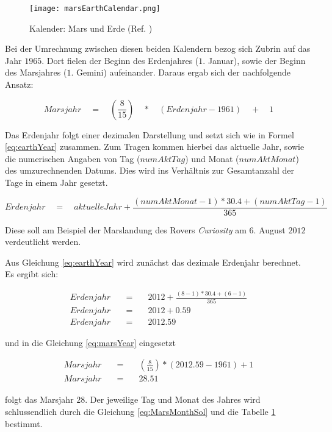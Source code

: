 \begin{figure}[H]
	\centering
	\texttt{[image: marsEarthCalendar.png]}
	\label{fig:marsEarthCalendar}
	\caption{Kalender: Mars und Erde (Ref. \cite{img2})}
\end{figure}

Bei der Umrechnung zwischen diesen beiden Kalendern bezog sich Zubrin auf das
Jahr $1965$. Dort fielen der Beginn des Erdenjahres ($1.$ Januar), sowie der
Beginn des Marsjahres ($1.$ Gemini) aufeinander. Daraus ergab sich der
nachfolgende Ansatz:

\begin{equation}
	Marsjahr \quad = \quad (\frac{8}{15}) \quad * \quad (Erdenjahr - 1961) \quad +
	\quad 1
	\label{eq:marsYear}
\end{equation}

Das Erdenjahr folgt einer dezimalen Darstellung und setzt sich wie in Formel
\ref{eq:earthYear} zusammen. Zum Tragen kommen hierbei das aktuelle Jahr, sowie
die numerischen Angaben von Tag ($numAktTag$) und Monat ($numAktMonat$) des
umzurechnenden Datums. Dies wird ins Verh{\"a}ltnis zur Gesamtanzahl der Tage in
einem Jahr gesetzt.

\begin{equation}
	Erdenjahr \quad = \quad aktuelleJahr + \frac{ (numAktMonat - 1) * 30.4 +
	(numAktTag - 1) }{365}
	\label{eq:earthYear}
\end{equation}

Diese soll am Beispiel der Marslandung des Rovers \textit{Curiosity} am
$6.$ August $2012$ verdeutlicht werden.

Aus Gleichung \ref{eq:earthYear} wird zun{\"a}chst das dezimale Erdenjahr
berechnet.
Es ergibt sich:

\begin{eqnarray}
	Erdenjahr \quad & = & \quad 2012 + \frac{ (8-1) * 30.4 + (6-1) }{365} \\
	Erdenjahr \quad & = & \quad 2012 + 0.59 \\
	Erdenjahr \quad & = & \quad 2012.59
\end{eqnarray}

und in die Gleichung \ref{eq:marsYear} eingesetzt

\begin{eqnarray}
	Marsjahr \quad & = & \quad (\frac{8}{15}) * (2012.59 - 1961) + 1 \\
	Marsjahr \quad & = & \quad 28.51
\end{eqnarray}

folgt das Marsjahr $28$. Der jeweilige Tag und Monat des Jahres wird
schlussendlich durch die Gleichung \ref{eq:MarsMonthSol} und die Tabelle
\ref{fig:marsEarthCalendar} bestimmt.

